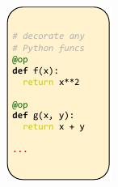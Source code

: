 \documentclass{article} %
\begin{document}
\begin{figure}[h]
\centering
\begin{subfigure}{0.23\textwidth}
\centering
\includegraphics[width=\textwidth]{img/fig1.pdf}
\caption{}
\end{subfigure}
\begin{subfigure}{0.35\textwidth}
\centering

\end{subfigure}
\end{figure}
\end{document}
